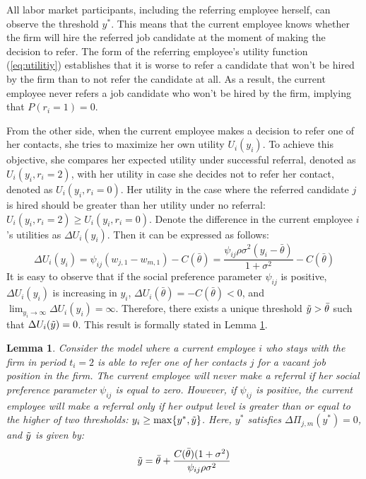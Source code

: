 \documentclass[12pt]{article}
\newtheorem{lemma}{Lemma}
\begin{document}
All labor market participants, including the referring employee herself, can observe the threshold $y^*$. This means that the current employee knows whether the firm will hire the referred job candidate at the moment of making the decision to refer. The form of the referring employee's utility function (\ref{eq:utilitiy}) establishes that it is worse to refer a candidate that won't be hired by the firm than to not refer the candidate at all. As a result, the current employee never refers a job candidate who won't be hired by the firm, implying that $P(r_i = 1) = 0$. %

From the other side, when the current employee makes a decision to refer one of her contacts, she tries to maximize her own utility $U_i(y_i)$. To achieve this objective, she compares her expected utility under successful referral, denoted as $U_i(y_i, r_i = 2)$, with her utility in case she decides not to refer her contact, denoted as $U_i(y_i, r_i = 0)$. Her utility in the case where the referred candidate $j$ is hired should be greater than her utility under no referral: $U_i(y_i, r_i=2) \geq U_i(y_i, r_i = 0)$. Denote the difference in the current employee $i$'s utilities as $\Delta U_i(y_i)$. Then it can be expressed as follows:
\begin{equation}
    \Delta U_i (y_i) = \psi_{ij}\left( w_{j,1}- w_{m,1}\right) - C\left( \bar{\theta} \right) = \frac{\psi_{ij}\rho\sigma^2\left( y_i - \bar{\theta} \right)}{1+\sigma^2} - C\left( \bar{\theta} \right)
\end{equation}
It is easy to observe that if the social preference parameter $\psi_{ij}$ is positive,  $\Delta U_i(y_i)$ is increasing in $y_i$, $\Delta U_i(\bar{\theta}) = -C\left(\bar{\theta}\right)<0$, and $\lim_{y_i \rightarrow \infty}{\Delta U_i(y_i) = \infty}$. Therefore, there exists a unique threshold $\Tilde{y}>\bar{\theta}$ such that $\Delta U_i(\Tilde{y})=0$. This result is formally stated in Lemma \ref{lemma:y_tilde_existence}.
\begin{lemma}\label{lemma:y_tilde_existence}
    Consider the model where a current employee $i$ who stays with the firm in period $t_i = 2$ is able to refer one of her contacts $j$ for a vacant job position in the firm.  The current employee will never make a referral if her social preference parameter $\psi_{ij}$ is equal to zero. However, if $\psi_{ij}$ is positive, the current employee will make a referral only if her output level is greater than or equal to the higher of two thresholds: $y_i \geq \max \lbrace y^*, \Tilde{y} \rbrace$. Here, $y^*$ satisfies $\Delta\Pi_{j,m}(y^*) = 0$, and $\Tilde{y}$ is given by:
    \begin{equation}
        \Tilde{y} = \bar{\theta}+\frac{C(\bar{\theta})(1+\sigma^2)}{\psi_{ij}\rho\sigma^2}
    \end{equation}
\end{lemma}
\end{document}

